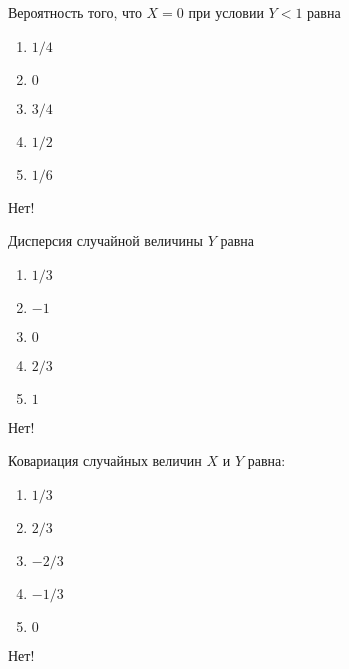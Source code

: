 \documentclass[t]{beamer}
\begin{document}
 \begin{frame} \label{30-No} 
\begin{block}{30} 

Вероятность того, что $X=0$ при условии $Y<1$ равна
  


 \end{block} 
\begin{enumerate} 
\item[] \hyperlink{30-Yes}{\beamergotobutton{} $1/4$}
\item[] \hyperlink{30-No}{\beamergotobutton{} $0$}
\item[] \hyperlink{30-No}{\beamergotobutton{} $3/4$
}
\item[] \hyperlink{30-No}{\beamergotobutton{} $1/2$}
\item[] \hyperlink{30-No}{\beamergotobutton{} $1/6$}
\end{enumerate} 

 \alert{Нет!} 
\end{frame} 


 \begin{frame} \label{31-No} 
\begin{block}{31} 

  Дисперсия случайной величины $Y$ равна
  


 \end{block} 
\begin{enumerate} 
\item[] \hyperlink{31-No}{\beamergotobutton{} $1/3$}
\item[] \hyperlink{31-No}{\beamergotobutton{} $-1$}
\item[] \hyperlink{31-No}{\beamergotobutton{} $0$}
\item[] \hyperlink{31-Yes}{\beamergotobutton{} $2/3$}
\item[] \hyperlink{31-No}{\beamergotobutton{} $1$}
\end{enumerate} 

 \alert{Нет!} 
\end{frame} 


 \begin{frame} \label{32-No} 
\begin{block}{32} 

 Ковариация случайных величин $X$ и $Y$ равна:
  


 \end{block} 
\begin{enumerate} 
\item[] \hyperlink{32-No}{\beamergotobutton{} $1/3$}
\item[] \hyperlink{32-No}{\beamergotobutton{} $2/3$}
\item[] \hyperlink{32-No}{\beamergotobutton{} $-2/3$}
\item[] \hyperlink{32-Yes}{\beamergotobutton{} $-1/3$}
\item[] \hyperlink{32-No}{\beamergotobutton{} $0$}
\end{enumerate} 

 \alert{Нет!} 
\end{frame} 
\end{document}
